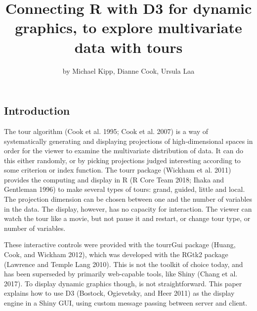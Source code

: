 \title{Connecting R with D3 for dynamic graphics, to explore multivariate data
with tours}
\author{by Michael Kipp, Dianne Cook, Ursula Laa}

\maketitle


\subsection{Introduction}\label{introduction}

The tour algorithm (Cook et al. 1995; Cook et al. 2007) is a way of
systematically generating and displaying projections of high-dimensional
spaces in order for the viewer to examine the multivariate distribution
of data. It can do this either randomly, or by picking projections
judged interesting according to some criterion or index function. The
tourr package (Wickham et al. 2011) provides the computing and display
in R (R Core Team 2018; Ihaka and Gentleman 1996) to make several types
of tours: grand, guided, little and local. The projection dimension can
be chosen between one and the number of variables in the data. The
display, however, has no capacity for interaction. The viewer can watch
the tour like a movie, but not pause it and restart, or change tour
type, or number of variables.

These interactive controls were provided with the tourrGui package
(Huang, Cook, and Wickham 2012), which was developed with the RGtk2
package (Lawrence and {Temple Lang} 2010). This is not the toolkit of
choice today, and has been superseded by primarily web-capable tools,
like Shiny (Chang et al. 2017). To display dynamic graphics though, is
not straightforward. This paper explains how to use D3 (Bostock,
Ogievetsky, and Heer 2011) as the display engine in a Shiny GUI, using
custom message passing between server and client.

